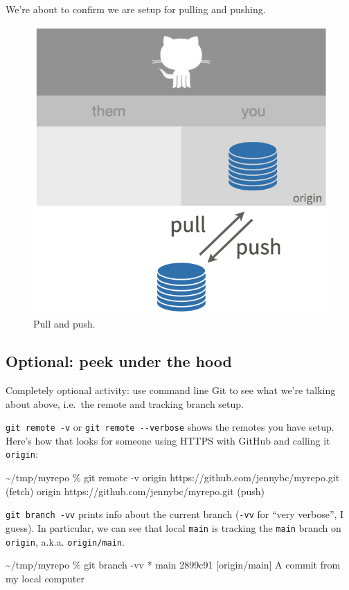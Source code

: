 \documentclass[
]{book}
\newenvironment{Shaded}{\begin{snugshade}}{\end{snugshade}}
\newcommand{\NormalTok}[1]{#1}
\begin{document}
We're about to confirm we are setup for pulling and pushing.

\begin{figure}
\includegraphics[width=0.6\linewidth]{img/github-pull-push} \caption{Pull and push.}\label{fig:github-pull-push}
\end{figure}

\subsection{Optional: peek under the hood}\label{optional-peek-under-the-hood}

Completely optional activity: use command line Git to see what we're talking about above, i.e.~the remote and tracking branch setup.

\texttt{git\ remote\ -v} or \texttt{git\ remote\ -\/-verbose} shows the remotes you have setup.
Here's how that looks for someone using HTTPS with GitHub and calling it \texttt{origin}:

\begin{Shaded}
\begin{Highlighting}[]
\NormalTok{\textasciitilde{}/tmp/myrepo \% git remote {-}v}
\NormalTok{origin  https://github.com/jennybc/myrepo.git (fetch)}
\NormalTok{origin  https://github.com/jennybc/myrepo.git (push)}
\end{Highlighting}
\end{Shaded}

\texttt{git\ branch\ -vv} prints info about the current branch (\texttt{-vv} for ``very verbose'', I guess).
In particular, we can see that local \texttt{main} is tracking the \texttt{main} branch on \texttt{origin}, a.k.a. \texttt{origin/main}.

\begin{Shaded}
\begin{Highlighting}[]
\NormalTok{\textasciitilde{}/tmp/myrepo \% git branch {-}vv}
\NormalTok{* main 2899c91 [origin/main] A commit from my local computer}
\end{Highlighting}
\end{Shaded}
\end{document}

